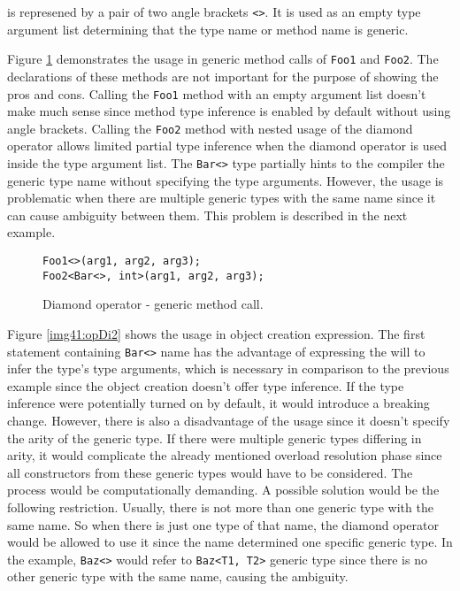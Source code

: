 is represened by a pair of two angle brackets \texttt{<>}.
It is used as an empty type argument list determining that the type name or method name is generic.
\par
Figure \ref{img40:opDi1} demonstrates the usage in generic method calls of \texttt{Foo1} and \texttt{Foo2}. 
The declarations of these methods are not important for the purpose of showing the pros and cons. 
Calling the \texttt{Foo1} method with an empty argument list doesn’t make much sense since method type inference is enabled by default without using angle brackets. 
Calling the \texttt{Foo2} method with nested usage of the diamond operator allows limited partial type inference when the diamond operator is used inside the type argument list. 
The \texttt{Bar<>} type partially hints to the compiler the generic type name without specifying the type arguments. 
However, the usage is problematic when there are multiple generic types with the same name since it can cause ambiguity between them. 
This problem is described in the next example.
\begin{figure}[h]
\begin{lstlisting}[style=csharp]
Foo1<>(arg1, arg2, arg3);
Foo2<Bar<>, int>(arg1, arg2, arg3);
\end{lstlisting}
\caption{Diamond operator - generic method call.}
\label{img40:opDi1}
\end{figure}
\par
Figure \ref{img41:opDi2} shows the usage in object creation expression. 
The first statement containing \texttt{Bar<>} name has the advantage of expressing the will to infer the type’s type arguments, which is necessary in comparison to the previous example since the object creation doesn’t offer type inference. 
If the type inference were potentially turned on by default, it would introduce a breaking change. 
However, there is also a disadvantage of the usage since it doesn’t specify the arity of the generic type. If there were multiple generic types differing in arity, it would complicate the already mentioned overload resolution phase since all constructors from these generic types would have to be considered. The process would be computationally demanding. 
A possible solution would be the following restriction. 
Usually, there is not more than one generic type with the same name. 
So when there is just one type of that name, the diamond operator would be allowed to use it since the name determined one specific generic type. 
In the example, \texttt{Baz<>} would refer to \texttt{Baz<T1, T2>} generic type since there is no other generic type with the same name, causing the ambiguity.
